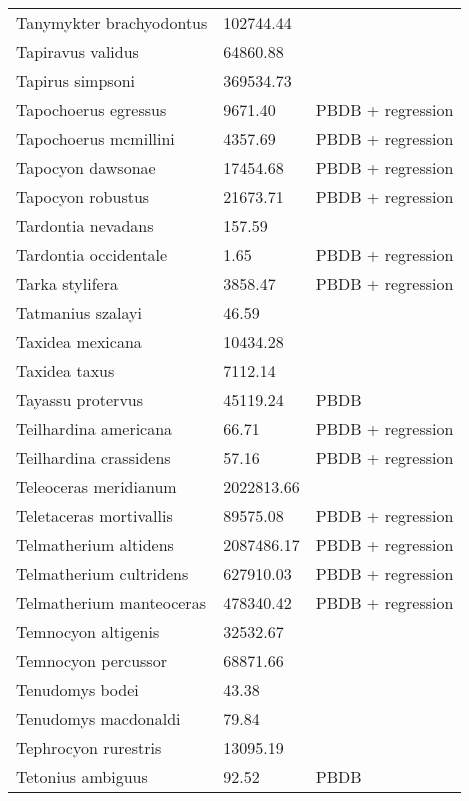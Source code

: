 \documentclass{article}
\begin{document}
\begin{center}
\begin{longtable}{p{} p{} p{}}
    Tanymykter brachyodontus & 102744.44 & \cite{Tomiya2013} \\ 
    Tapiravus validus & 64860.88 & \cite{Tomiya2013} \\ 
    Tapirus simpsoni & 369534.73 & \cite{Tomiya2013} \\ 
    Tapochoerus egressus & 9671.40 & PBDB + regression \\ 
    Tapochoerus mcmillini & 4357.69 & PBDB + regression \\ 
    Tapocyon dawsonae & 17454.68 & PBDB + regression \\ 
    Tapocyon robustus & 21673.71 & PBDB + regression \\ 
    Tardontia nevadans & 157.59 & \cite{Tomiya2013} \\ 
    Tardontia occidentale & 1.65 & PBDB + regression \\ 
    Tarka stylifera & 3858.47 & PBDB + regression \\ 
    Tatmanius szalayi & 46.59 & \cite{Ferrusquia-Villafranca2006} \\ 
    Taxidea mexicana & 10434.28 & \cite{Bloch2007} \\ 
    Taxidea taxus & 7112.14 & \cite{Smith2004} \\ 
    Tayassu protervus & 45119.24 & PBDB \\ 
    Teilhardina americana & 66.71 & PBDB + regression \\ 
    Teilhardina crassidens & 57.16 & PBDB + regression \\ 
    Teleoceras meridianum & 2022813.66 & \cite{Tomiya2013} \\ 
    Teletaceras mortivallis & 89575.08 & PBDB + regression \\ 
    Telmatherium altidens & 2087486.17 & PBDB + regression \\ 
    Telmatherium cultridens & 627910.03 & PBDB + regression \\ 
    Telmatherium manteoceras & 478340.42 & PBDB + regression \\ 
    Temnocyon altigenis & 32532.67 & \cite{Tomiya2013} \\ 
    Temnocyon percussor & 68871.66 & \cite{Tomiya2013} \\ 
    Tenudomys bodei & 43.38 & \cite{Tomiya2013} \\ 
    Tenudomys macdonaldi & 79.84 & \cite{Tomiya2013} \\ 
    Tephrocyon rurestris & 13095.19 & \cite{Tomiya2013} \\ 
    Tetonius ambiguus & 92.52 & PBDB \\ 

\end{longtable}
\end{center}
\end{document}

